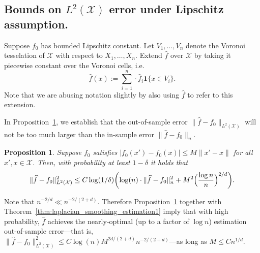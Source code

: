 \documentclass[twoside]{article}
\newcommand{\1}{\mathbf{1}}
\newcommand{\Xset}{\mathcal{X}}
\newcommand{\Leb}{L}
\newcommand{\mc}[1]{\mathcal{#1}}
\newcommand{\wh}[1]{\widehat{#1}}
\newtheorem{proposition}{Proposition}
\theoremstyle{definition}
\theoremstyle{remark}
\begin{document}
\subsection{Bounds on $\Leb^2(\Xset)$ error under Lipschitz assumption.}
Suppose $f_0$ has bounded Lipschitz constant. Let $V_1,\ldots,V_n$ denote the Voronoi tesselation of $\Xset$ with respect to $X_1,\ldots,X_n$. Extend $\wh{f}$ over $\Xset$ by taking it piecewise constant over the Voronoi cells, i.e.
\begin{equation*}
\wh{f}(x) := \sum_{i = 1}^{n} \cdot \wh{f}_i \1\{x \in V_i\}.
\end{equation*}
Note that we are abusing notation slightly by also using $\wh{f}$ to refer to this extension. 

In Proposition~\ref{prop:out_of_sample_error}, we establish that the out-of-sample error $\|\wh{f} - f_0\|_{\Leb^2(\Xset)}$ will not be too much larger than the in-sample error $\|\wh{f} - f_0\|_n$.
\begin{proposition}
	\label{prop:out_of_sample_error}
	Suppose $f_0$ satisfies $|f_0(x') - f_0(x)| \leq M \|x' - x\|$ for all $x',x \in \mc{X}$. Then, with probability at least $1 - \delta$ it holds that
	\begin{equation*}
	\|\wh{f} - f_0\|_{\Leb^2(\Xset)}^2 \leq C \log(1/\delta) \biggl(\log(n)\cdot \|\wh{f} - f_0\|_n^2 + M^2\Bigl(\frac{\log n}{n}\Bigr)^{2/d}\biggr).
	\end{equation*}
\end{proposition}
Note that $n^{-2/d} \ll n^{-2/(2 +d)}$. Therefore Proposition~\ref{prop:out_of_sample_error} together with Theorem~\ref{thm:laplacian_smoothing_estimation1} imply that with high probability, $\wh{f}$ achieves the nearly-optimal (up to a factor of $\log n$) estimation out-of-sample error---that is, $\|\wh{f} - f_0\|_{\Leb^2(\Xset)}^2 \leq C \log(n) M^{2d/(2 + d)}n^{-2/(2+d)}$---as long as $M \leq Cn^{1/d}$.
\end{document}
